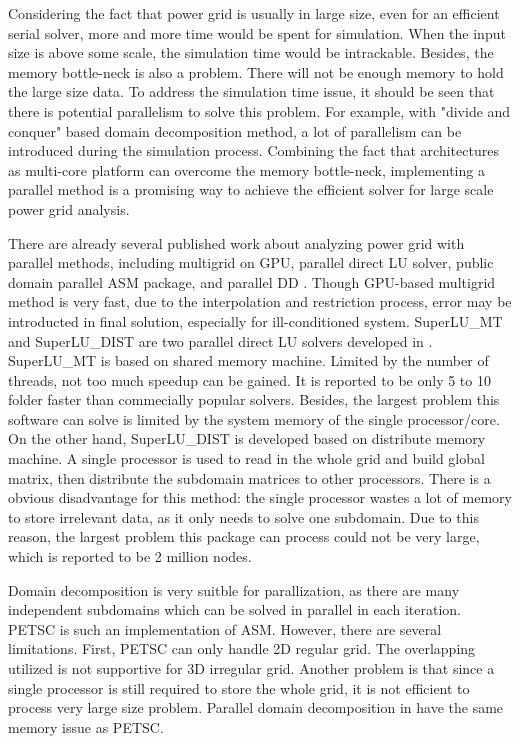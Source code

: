 \documentclass{sig-alternate}
\begin{document}
	Considering the fact that power grid is usually in large size, even for an efficient serial solver, more and more time would be
	spent for simulation. When the input size is above some scale, the simulation time would be intrackable.
	Besides, the memory bottle-neck is also a problem. There will not be enough memory to hold the large size data. To address the
	simulation time issue, it should be seen that there is potential parallelism to solve this problem. For example, with "divide and
	conquer" based domain decomposition method, a lot of parallelism can be introduced during the simulation process. Combining the 
	fact that architectures as multi-core platform can overcome the memory bottle-neck, implementing a parallel method is a 
	promising way to achieve the efficient solver for large scale power grid analysis. 

	There are already several published work about analyzing power grid with parallel methods, including multigrid on 
	GPU\cite{Zhuofeng}, parallel direct LU 
	solver\cite{Super_LU_website}, public domain parallel ASM package\cite{PETSC_website}, and parallel DD
	\cite{kaisun, voronov}. Though GPU-based multigrid method\cite{Zhuofeng} is very fast, due to the interpolation and restriction
	process, error may be
	introducted in final solution, especially for ill-conditioned system. SuperLU\_MT and SuperLU\_DIST are two parallel direct LU 
	solvers developed in \cite{Super_LU_website}. SuperLU\_MT is 
	based on shared memory machine. Limited by the number of threads, not too much speedup can be gained. 
	It is reported to be only 5 to 10 folder faster than commecially popular solvers\cite{Super_LU_website}. Besides, the largest 
	problem this software can solve is limited by the system memory of the single processor/core. On the other hand, SuperLU\_DIST 
	is developed based on distribute memory machine. A single processor is used to read in the whole grid and build global 
	matrix, then distribute the subdomain matrices to other processors. 
	There is a obvious disadvantage for this method: the single processor wastes a lot of memory to store irrelevant data, as 
	it only needs to solve one subdomain. Due to this reason, the largest problem this package can 
	process could not be very large, which is reported to be 2 million nodes\cite{Super_LU_website}.

	Domain decomposition is very suitble for parallization, as there are many independent subdomains which can be
	solved in parallel in each iteration. PETSC\cite{PETSC_website} is such an implementation of ASM.
	However, there are several limitations. First, PETSC can only handle 2D regular grid. 
	The overlapping utilized is not supportive for 3D irregular grid. Another problem is that since a single processor is 
	still required to
	store the whole grid, it is not efficient to process very large size problem. Parallel domain decomposition in \cite{kaisun, voronov} have
	the same memory issue as PETSC.
	
\end{document}
